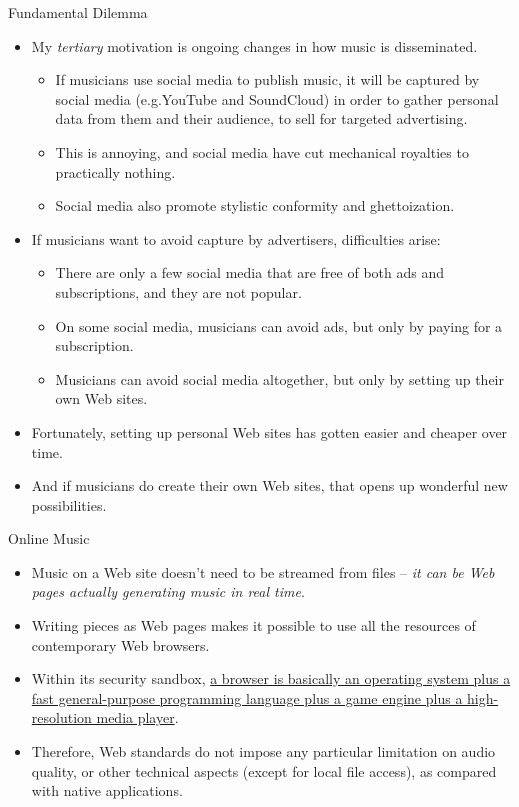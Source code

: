 \documentclass{beamer}
\begin{document}
\begin{frame}{Fundamental Dilemma}
\begin{itemize}
\item My \emph{tertiary} motivation is ongoing changes in how music is disseminated.
\begin{itemize}
\item If musicians use social media to publish music, it will be captured by social media (e.g.YouTube and SoundCloud) in order to gather personal data from them and their audience, to sell for targeted advertising.
\item This is annoying, and social media have cut mechanical royalties to practically nothing.
\item Social media also promote stylistic conformity and ghettoization.
\end{itemize}
\end{itemize}
\end{frame}

\begin{frame}{}
\begin{itemize}
\item If musicians want to avoid capture by advertisers, difficulties arise:
\begin{itemize}
\item There are only a few social media that are free of both ads and subscriptions, and they are not popular.
\item On some social media, musicians can avoid ads, but only by paying for a subscription.
\item Musicians can avoid social media altogether, but only by setting up their own Web sites.
\end{itemize}
\item Fortunately, setting up personal Web sites has gotten easier and cheaper over time.
\item And if musicians do create their own Web sites, that opens up wonderful new possibilities.
\end{itemize}
\end{frame}

\begin{frame}{Online Music}
\begin{itemize}
\item Music on a Web site doesn't need to be streamed from files -- \emph{it can be Web pages actually generating music in real time}.
\item Writing pieces as Web pages makes it possible to use all the resources of contemporary Web browsers.
\item Within its security sandbox, \href{https://html5test.co/}{a browser is basically an operating system plus a fast general-purpose programming language plus a game engine plus a high-resolution media player}.
\item Therefore, Web standards do not impose any particular limitation on audio quality, or other technical aspects (except for local file access), as compared with native applications.
\end{itemize}
\end{frame}
\end{document}
